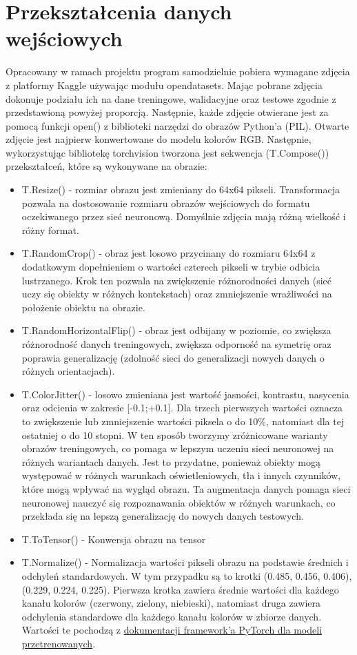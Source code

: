 \documentclass[11pt]{article}
\begin{document}
	\section{Przekształcenia danych wejściowych}
	Opracowany w ramach projektu program samodzielnie pobiera wymagane zdjęcia z platformy Kaggle używając modułu
	opendatasets. Mając pobrane zdjęcia dokonuje podziału ich na dane treningowe, walidacyjne oraz testowe zgodnie z 
	przedstawioną powyżej proporcją.
	Następnie, każde zdjęcie otwierane jest za pomocą funkcji open() z biblioteki narzędzi do obrazów Python'a (PIL).
	Otwarte zdjęcie jest najpierw konwertowane do modelu kolorów RGB. Następnie, wykorzystując bibliotekę torchvision
	tworzona jest sekwencja (T.Compose()) przekształceń, które są wykonywane na obrazie:
	\begin{itemize}
		\item T.Resize() - rozmiar obrazu jest zmieniany do 64x64 pikseli.
			Transformacja pozwala na dostosowanie rozmiaru obrazów wejściowych do formatu oczekiwanego
			przez sieć neuronową. Domyślnie zdjęcia mają różną wielkość i różny format.
		\item T.RandomCrop() - obraz jest losowo przycinany do rozmiaru 64x64 z dodatkowym dopełnieniem o wartości czterech pikseli w trybie odbicia lustrzanego.
			Krok ten pozwala na zwiększenie różnorodności danych (sieć uczy się obiekty w różnych kontekstach) oraz zmniejszenie wrażliwości na położenie obiektu na obrazie.
		\item T.RandomHorizontalFlip() - obraz jest odbijany w poziomie, co zwiększa różnorodność danych treningowych,
			zwiększa odporność na symetrię oraz poprawia generalizację (zdolność sieci do generalizacji nowych danych o różnych orientacjach).
		\item T.ColorJitter() - losowo zmieniana jest wartość jasności, kontrastu, nasycenia oraz odcienia w zakresie [-0.1;+0.1]. Dla trzech pierwszych wartości oznacza to
			zwiększenie lub zmniejszenie wartości piksela o do 10\%, natomiast dla tej ostatniej o do 10 stopni. W ten sposób tworzymy zróżnicowane warianty obrazów treningowych,
			co pomaga w lepszym uczeniu sieci neuronowej na różnych wariantach danych. Jest to przydatne, ponieważ obiekty mogą występować w różnych warunkach oświetleniowych,
			tła i innych czynników, które mogą wpływać na wygląd obrazu. Ta augmentacja danych pomaga sieci neuronowej nauczyć się rozpoznawania obiektów w różnych warunkach,
			co przekłada się na lepszą generalizację do nowych danych testowych.
		\item T.ToTensor() - Konwersja obrazu na tensor 
		\item T.Normalize() - Normalizacja wartości pikseli obrazu na podstawie średnich i odchyleń standardowych. W tym przypadku są to krotki (0.485, 0.456, 0.406), (0.229, 0.224, 0.225).
			Pierwsza krotka zawiera średnie wartości dla każdego kanału kolorów (czerwony, zielony, niebieski), natomiast druga zawiera odchylenia standardowe dla każdego kanału kolorów w zbiorze danych.
			Wartości te pochodzą z \href{https://pytorch.org/vision/stable/models.html}{dokumentacji framework'a PyTorch dla modeli przetrenowanych}.
	\end{itemize}
\end{document}
